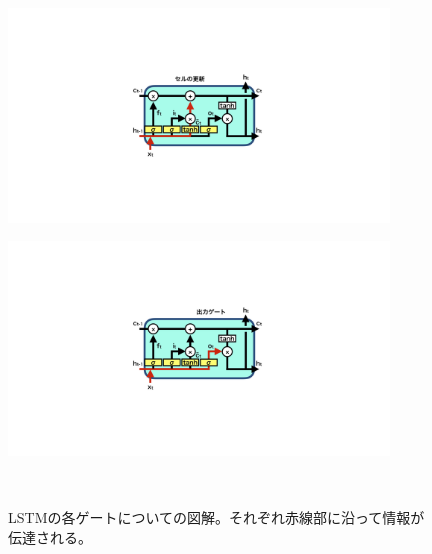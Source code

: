 \begin{figure}[htbp]
  \begin{minipage}{1.0\textwidth}
  \centering
   \begin{minipage}{0.48\textwidth}
   \centering
    \includegraphics[trim = 600 300 600 300, width=0.9\textwidth, clip]{Figure/2DeepLearning/14CellUpdate.png}
    \label{14CellUpdate}
   \end{minipage}
   \begin{minipage}{0.48\textwidth}
   \centering
    \includegraphics[trim = 600 300 600 300, width=0.9\textwidth, clip]{Figure/2DeepLearning/15OutputGate.png}
    \label{15OutputGate}
   \end{minipage}
   \end{minipage}
  \caption[LSTMの各ゲートについての図解]{LSTMの各ゲートについての図解。それぞれ赤線部に沿って情報が伝達される。}
\end{figure}


